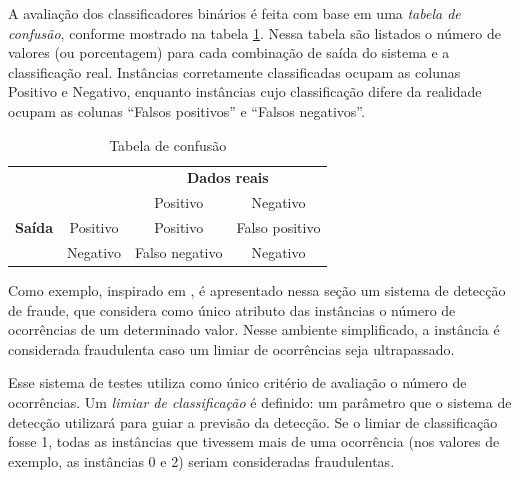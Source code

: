 A avaliação dos classificadores binários é feita com base em uma \emph{tabela de confusão}, conforme mostrado na tabela \ref{fraud:confusion}. Nessa tabela são listados o número de valores (ou porcentagem) para cada combinação de saída do sistema e a classificação real. Instâncias corretamente classificadas ocupam as colunas Positivo e Negativo, enquanto instâncias cujo classificação difere da realidade ocupam as colunas ``Falsos positivos'' e ``Falsos negativos''.

\vspace{0.5cm}
\renewcommand{\arraystretch}{1.5}
\begin{table}[h!]
    \centering
    \caption{Tabela de confusão}
    \label{fraud:confusion}
    \vspace{0.5cm}
    \begin{tabular}{c l c c}
        & & \multicolumn{2}{c}{\textbf{Dados reais}} \\
        \multirow{3}{5mm}{\begin{sideways}\parbox{20mm}{\textbf{Saída}}\end{sideways}} & \multicolumn{1}{c|}{} & Positivo & Negativo \\
        \cline{2-4}
        & \multicolumn{1}{c|}{Positivo} & Positivo & Falso positivo\\
        & \multicolumn{1}{c|}{Negativo} & Falso negativo & Negativo\\
    \end{tabular}
\end{table}
\vspace{0.5cm}

Como exemplo, inspirado em \citet{Bewick2004}, é apresentado nessa seção um sistema de detecção de fraude, que considera como único atributo das instâncias o número de ocorrências de um determinado valor. Nesse ambiente simplificado, a instância é considerada fraudulenta caso um limiar de ocorrências seja ultrapassado.

Esse sistema de testes utiliza como único critério de avaliação o número de ocorrências. Um \emph{limiar de classificação} é definido: um parâmetro que o sistema de detecção utilizará para guiar a previsão da detecção. Se o limiar de classificação fosse 1, todas as instâncias que tivessem mais de uma ocorrência (nos valores de exemplo, as instâncias 0 e 2) seriam consideradas fraudulentas.

